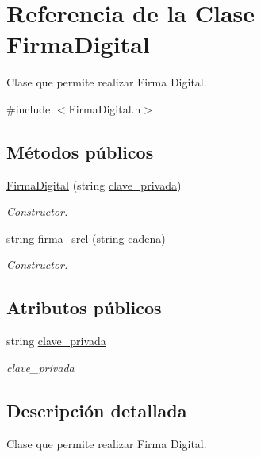 \hypertarget{classFirmaDigital}{}\section{Referencia de la Clase Firma\+Digital}
\label{classFirmaDigital}


Clase que permite realizar Firma Digital.  




{\ttfamily \#include $<$Firma\+Digital.\+h$>$}

\subsection*{Métodos públicos}
\begin{DoxyCompactItemize}
\item 
\hyperlink{classFirmaDigital_a327b0fa8329a7e33cc04f8d4793652be}{Firma\+Digital} (string \hyperlink{classFirmaDigital_a912b493f793c1e2ca268b534e65a65a0}{clave\+\_\+privada})
\begin{DoxyCompactList}\small\item\em Constructor. \end{DoxyCompactList}\item 
string \hyperlink{classFirmaDigital_ac68550394f9f4e0b73e80dc050875325}{firma\+\_\+srcl} (string cadena)
\begin{DoxyCompactList}\small\item\em Constructor. \end{DoxyCompactList}\end{DoxyCompactItemize}
\subsection*{Atributos públicos}
\begin{DoxyCompactItemize}
\item 
string \hyperlink{classFirmaDigital_a912b493f793c1e2ca268b534e65a65a0}{clave\+\_\+privada}
\begin{DoxyCompactList}\small\item\em clave\+\_\+privada \end{DoxyCompactList}\end{DoxyCompactItemize}


\subsection{Descripción detallada}
Clase que permite realizar Firma Digital. 

